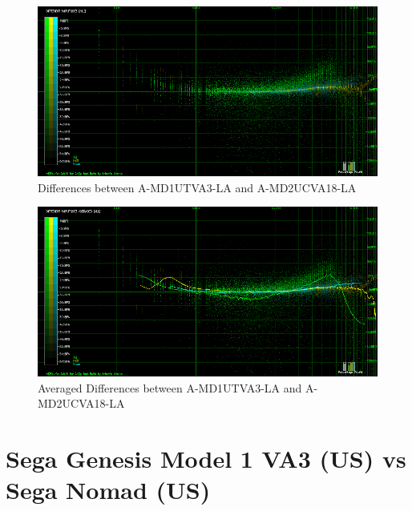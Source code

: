 \documentclass[10pt,a4paper]{report}
\begin{document}
\begin{figure}[H]
	\centering
	\includegraphics[width=1.0\linewidth]{images/results/5-1-A-MD1UTVA3-LA_vs_A-MD2UCVA18_LA.png}
	\caption[A-MD1UTVA3-LA vs A-MD2UCVA18-LA]{Differences between A-MD1UTVA3-LA and A-MD2UCVA18-LA}
	\label{fig:A-MD1UTVA3-LA_vs_A-MD2UCVA18_LA}
\end{figure}

\begin{figure}[H]
	\centering
	\includegraphics[width=1.0\linewidth]{images/results/5-2-A-MD1UTVA3-LA_vs_A-MD2UCVA18_LA.png}
	\caption[A-MD1UTVA3-LA vs A-MD2UCVA18-LA Averaged]{Averaged Differences between A-MD1UTVA3-LA and A-MD2UCVA18-LA}
	\label{fig:A-MD1UTVA3-LA_vs_A-MD2UCVA18_LA_AVG}
\end{figure}

\section{Sega Genesis Model 1 VA3 (US) vs\\ Sega Nomad (US)}
\end{document}
